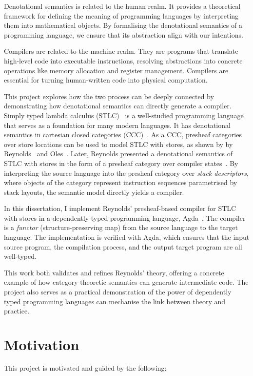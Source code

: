 \documentclass[12pt,a4paper]{report}
\theoremstyle{definition}
\newcounter{motivation}
\begin{document}
    Denotational semantics is related to the human realm. It provides a theoretical framework for defining the meaning of programming languages by interpreting them into mathematical objects. By formalising the denotational semantics of a programming language, we ensure that its abstraction align with our intentions.

    Compilers are related to the machine realm. They are programs that translate high-level code into executable instructions, resolving abstractions into concrete operations like memory allocation and register management. Compilers are essential for turning human-written code into physical computation.

    This project explores how the two process can be deeply connected by demonstrating how denotational semantics can directly generate a compiler. Simply typed lambda calculus (STLC)~\autocite{stlc} is a well-studied programming language that serves as a foundation for many modern languages. It has denotational semantics in cartesian closed categories (CCC)~\autocite{lambek}. As a CCC, presheaf categories over store locations can be used to model STLC with stores, as shown by by Reynolds~\autocite{essence} and Oles~\autocite{Oles_1,Oles_2}. Later, Reynolds presented a denotational semantics of STLC with stores in the form of a presheaf category over compiler states~\autocite{Reynolds}. By interpreting the source language into the presheaf category over \emph{stack descriptors}, where objects of the category represent instruction sequences parametrised by stack layouts, the semantic model directly yields a compiler. 
    
    In this dissertation, I implement Reynolds' presheaf-based compiler for STLC with stores in a dependently typed programming language, Agda~\autocite{Agda}. The compiler is a \emph{functor} (structure-preserving map) from the source language to the target language. The implementation is verified with Agda, which ensures that the input source program, the compilation process, and the output target program are all well-typed.

    This work both validates and refines Reynolds' theory, offering a concrete example of how category-theoretic semantics can generate intermediate code. The project also serves as a practical demonstration of the power of dependently typed programming languages can mechanise the link between theory and practice.

    \section{Motivation} \label{sec: motivation}
        This project is motivated and guided by the following:
        
\end{document}

